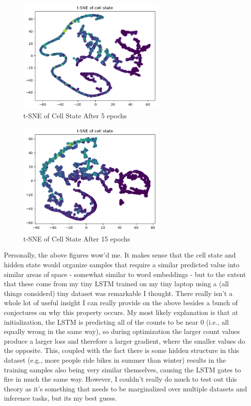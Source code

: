 \documentclass[12pt, twoside]{report}
\begin{document}
\begin{figure}[H]
    \centering
    \includegraphics[width=0.65\textwidth]{figures/cell state evolution/5 epoch.png}
    \caption*{t-SNE of Cell State After 5 epochs}
\end{figure}

\begin{figure}[H]
    \centering
    \includegraphics[width=0.65\textwidth]{figures/cell state evolution/15 epoch.png}
    \caption*{t-SNE of Cell State After 15 epochs}
\end{figure}

Personally, the above figures wow'd me. It makes sense that the cell state and hidden state would organize
samples that require a similar predicted value into similar areas of space - somewhat similar to word embeddings -
but to the extent that these come from my tiny LSTM trained on my tiny laptop using a (all things considerd) tiny dataset
was remarkable I thought.
There really isn't a whole lot of useful insight I can really provide on the above besides a bunch of
conjectures on why this property occurs.
My most likely explanation is that at initialization, the LSTM is predicting all of the counts to be near 0
(i.e., all equally wrong in the same way), so during optimization the larger count values produce a larger 
loss and therefore a larger gradient, where the smaller values do the opposite. This, coupled with the fact
there is some hidden structure in this dataset (e.g., more people ride bikes in summer than winter)
results in the training samples also being very similar themselves, causing the LSTM gates to fire in 
much the same way. However, I couldn't really do much to test out this theory as it's something that needs to be
marginalized over multiple datasets and inference tasks, but its my best guess.
\end{document}
